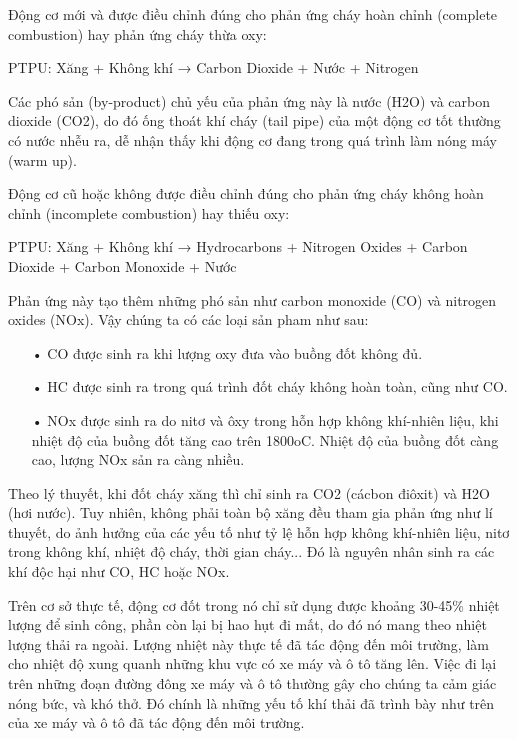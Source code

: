 Động cơ mới và được điều chỉnh đúng cho phản ứng cháy hoàn chỉnh (complete combustion) hay phản ứng cháy thừa oxy:

\begin{center}
PTPU: Xăng + Không khí → Carbon Dioxide + Nước + Nitrogen
\end{center} 
Các phó sản (by-product) chủ yếu của phản ứng này là nước (H2O) và carbon dioxide (CO2), do đó ống thoát khí cháy (tail pipe) của một động cơ tốt thường có nước nhễu ra, dễ nhận thấy khi động cơ đang trong quá trình làm nóng máy (warm up).

Động cơ cũ hoặc không được điều chỉnh đúng cho phản ứng cháy không hoàn chỉnh (incomplete combustion) hay thiếu oxy:
\begin{center}
PTPU: Xăng + Không khí → Hydrocarbons + Nitrogen Oxides + Carbon Dioxide + Carbon Monoxide + Nước
\end{center}

Phản ứng này tạo thêm những phó sản như carbon monoxide (CO) và nitrogen oxides (NOx). Vậy chúng ta có các loại sản pham như sau:
\begin{itemize}
\item[•]CO được sinh ra khi lượng oxy đưa vào buồng đốt không đủ.
\item[•]HC được sinh ra trong quá trình đốt cháy không hoàn toàn, cũng như CO.
\item[•]NOx được sinh ra do nitơ và ôxy trong hỗn hợp không khí-nhiên liệu, khi nhiệt độ của buồng đốt tăng cao trên 1800oC. Nhiệt độ của buồng đốt càng cao, lượng NOx sản ra càng nhiều.
\end{itemize}
 
 Theo lý thuyết, khi đốt cháy xăng thì chỉ sinh ra CO2 (cácbon điôxit) và H2O (hơi nước). Tuy nhiên, không phải toàn bộ xăng đều tham gia phản ứng như lí thuyết, do ảnh hưởng của các yếu tố như tỷ lệ hỗn hợp không khí-nhiên liệu, nitơ trong không khí, nhiệt độ cháy, thời gian cháy... Đó là nguyên nhân sinh ra các khí độc hại như CO, HC hoặc NOx.
 
Trên cơ sở thực tế, động cơ đốt trong nó chỉ sử dụng được khoảng 30-45\% nhiệt lượng để sinh công, phần còn lại bị hao hụt đi mất, do đó nó mang theo nhiệt lượng thải ra ngoài. Lượng nhiệt này thực tế đã tác động đến môi trường, làm cho nhiệt độ xung quanh những khu vực có xe máy và ô tô tăng lên. Việc đi lại trên những đoạn đường đông xe máy và ô tô thường gây cho chúng ta cảm giác nóng bức, và khó thở. Đó chính là những yếu tố khí thải đã trình bày như trên của xe máy và ô tô đã tác động đến môi trường.

